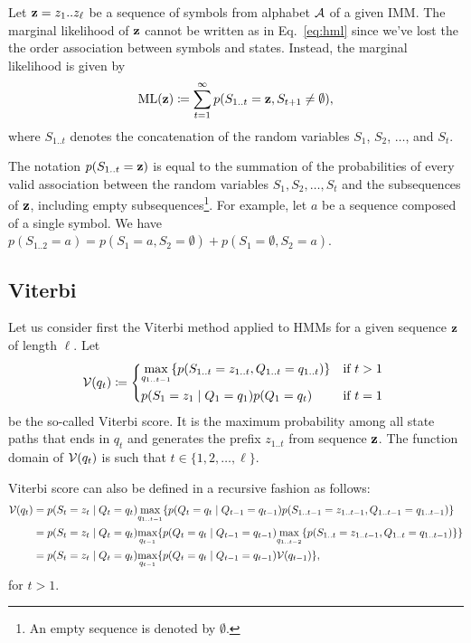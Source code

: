 Let $\mathbf{z}=z_1 .. z_\ell$ be a sequence of symbols from alphabet $\mathcal{A}$ of a given IMM.\@
The marginal likelihood of $\mathbf{z}$ cannot be written as in Eq.~\eqref{eq:hml} since
we've lost the the order association between symbols and states.
Instead, the marginal likelihood is given by
\begin{equation}\label{eq:ml}
  \mathrm{ML}(\mathbf{z}) \coloneqq \sum_{t=1}^{\infty} p(S_{1..t}=\mathbf{z}, S_{t+1}\neq \emptyset),
\end{equation}
where $S_{1..t}$ denotes the concatenation of the random variables $S_1$, $S_2$,
$\dots$, and $S_t$.

\begin{remark}
  The notation $p(S_{1..t}=\mathbf{z})$ is equal to the summation of the probabilities of every valid
  association between the random variables $S_1, S_2, \dots, S_t$ and the subsequences of $\mathbf{z}$,
  including empty subsequences\footnote{An empty sequence is denoted by $\emptyset$.}. For example,
  let $a$ be a sequence composed of a single symbol. We have $p(S_{1..2}=a) = p(S_1=a,
  S_2=\emptyset) + p(S_1=\emptyset, S_2=a)$.
\end{remark}

\subsection{Viterbi}

Let us consider first the Viterbi method applied to HMMs for a given sequence $\mathbf{z}$ of length
$\ell$.
Let
\begin{equation*}
  \viterbi(q_t) \eqdef
  \begin{dcases*}
    \umax{q_{1..t-1}} \{ p(S_{1..t}=z_{1..t}, Q_{1..t}=q_{1..t}) \} & if $t>1$ \\
    p(S_1=z_1 \gv Q_1=q_1) p(Q_1=q_t)                               & if $t=1$
  \end{dcases*}
\end{equation*}
be the so-called Viterbi score. It is the maximum probability among all state paths that ends in
$q_t$ and generates the prefix $z_{1..t}$ from sequence $\mathbf{z}$.
The function domain of $\mathcal{V}(q_t)$ is such that $t \in \{1, 2, \dots, \ell\}$.

Viterbi score can also be defined in a recursive fashion as follows:
\begin{equation*}
\begin{split}
  \mathcal{V}(q_t)
  &= p(S_t=z_t \;|\; Q_t=q_t) \underset{q_{1..t-1}}{\max}
    \{ p(Q_t=q_t \;|\; Q_{t-1}=q_{t-1}) p(S_{1..t-1}=z_{1..t-1}, Q_{1..t-1}=q_{1..t-1}) \} \\
  &= p(S_t=z_t \;|\; Q_t=q_t) \underset{q_{t-1}}{\max}
    \{ p(Q_t=q_t \;|\; Q_{t-1}=q_{t-1})
    \underset{q_{1..t-2}}{\max} \{ p(S_{1..t}=z_{1..t-1}, Q_{1..t}=q_{1..t-1}) \} \} \\
  &= p(S_t=z_t \;|\; Q_t=q_t) \underset{q_{t-1}}{\max} \{ p(Q_t=q_t \;|\; Q_{t-1}=q_{t-1})
    \mathcal{V}(q_{t-1}) \},
\end{split}
\end{equation*}
for $t>1$.

